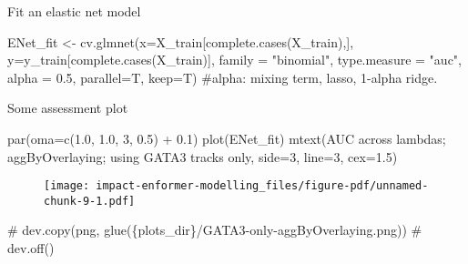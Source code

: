 \documentclass[
  letterpaper,
  DIV=11,
  numbers=noendperiod]{scrartcl}
\newenvironment{Shaded}{\begin{snugshade}}{\end{snugshade}}
\newcommand{\AttributeTok}[1]{\textcolor[rgb]{0.40,0.45,0.13}{#1}}
\newcommand{\CommentTok}[1]{\textcolor[rgb]{0.37,0.37,0.37}{#1}}
\newcommand{\DecValTok}[1]{\textcolor[rgb]{0.68,0.00,0.00}{#1}}
\newcommand{\FloatTok}[1]{\textcolor[rgb]{0.68,0.00,0.00}{#1}}
\newcommand{\FunctionTok}[1]{\textcolor[rgb]{0.28,0.35,0.67}{#1}}
\newcommand{\NormalTok}[1]{\textcolor[rgb]{0.00,0.23,0.31}{#1}}
\newcommand{\OtherTok}[1]{\textcolor[rgb]{0.00,0.23,0.31}{#1}}
\newcommand{\SpecialCharTok}[1]{\textcolor[rgb]{0.37,0.37,0.37}{#1}}
\newcommand{\StringTok}[1]{\textcolor[rgb]{0.13,0.47,0.30}{#1}}
\begin{document}
Fit an elastic net model

\begin{Shaded}
\begin{Highlighting}[]
\NormalTok{ENet\_fit }\OtherTok{\textless{}{-}} \FunctionTok{cv.glmnet}\NormalTok{(}\AttributeTok{x=}\NormalTok{X\_train[}\FunctionTok{complete.cases}\NormalTok{(X\_train),], }\AttributeTok{y=}\NormalTok{y\_train[}\FunctionTok{complete.cases}\NormalTok{(X\_train)], }\AttributeTok{family =} \StringTok{"binomial"}\NormalTok{, }
\AttributeTok{type.measure =} \StringTok{"auc"}\NormalTok{, }\AttributeTok{alpha =} \FloatTok{0.5}\NormalTok{, }\AttributeTok{parallel=}\NormalTok{T, }\AttributeTok{keep=}\NormalTok{T) }\CommentTok{\#alpha: mixing term, lasso, 1{-}alpha ridge.}
\end{Highlighting}
\end{Shaded}

Some assessment plot

\begin{Shaded}
\begin{Highlighting}[]
\FunctionTok{par}\NormalTok{(}\AttributeTok{oma=}\FunctionTok{c}\NormalTok{(}\FloatTok{1.0}\NormalTok{, }\FloatTok{1.0}\NormalTok{, }\DecValTok{3}\NormalTok{, }\FloatTok{0.5}\NormalTok{) }\SpecialCharTok{+} \FloatTok{0.1}\NormalTok{)}
\FunctionTok{plot}\NormalTok{(ENet\_fit)}
\FunctionTok{mtext}\NormalTok{(}\StringTok{\textquotesingle{}AUC across lambdas; aggByOverlaying; using GATA3 tracks only\textquotesingle{}}\NormalTok{, }\AttributeTok{side=}\DecValTok{3}\NormalTok{, }\AttributeTok{line=}\DecValTok{3}\NormalTok{, }\AttributeTok{cex=}\FloatTok{1.5}\NormalTok{)}
\end{Highlighting}
\end{Shaded}

\begin{figure}[H]

{\centering \texttt{[image: impact-enformer-modelling\_files/figure-pdf/unnamed-chunk-9-1.pdf]}

}

\end{figure}

\begin{Shaded}
\begin{Highlighting}[]
\CommentTok{\# dev.copy(png, glue(\textquotesingle{}\{plots\_dir\}/GATA3{-}only{-}aggByOverlaying.png\textquotesingle{}))}
\CommentTok{\# dev.off()}
\end{Highlighting}
\end{Shaded}
\end{document}
